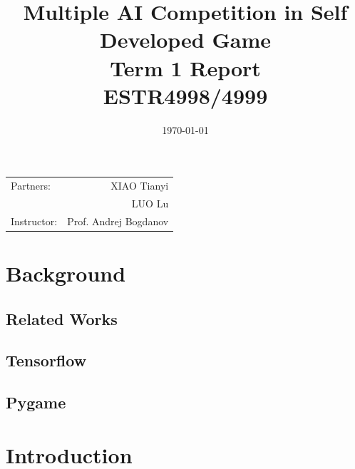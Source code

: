 \documentclass[14pt]{extarticle}
\title{\large Multiple AI Competition in Self Developed Game \\ Term 1 Report \\ ESTR4998/4999} %
\date{\today} %
\begin{document}
\maketitle %

\begin{center}
\begin{tabular}{l r}
Partners: & XIAO Tianyi \\ %
& LUO Lu \\
Instructor: & Prof. Andrej Bogdanov %
\end{tabular}
\end{center}
\newpage
\begin{abstract}
\end{abstract}



 

\section{Background}

\subsection{Related Works}

\subsection{Tensorflow}

\subsection{Pygame}



\section{Introduction}
\end{document}
